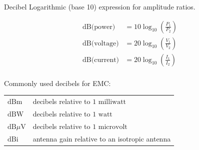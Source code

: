 \documentclass[
]{book}
\begin{document}
Decibel Logarithmic (base 10) expression for amplitude ratios.

\begin{align}
\text{dB(power)} &= 10 \log_10 \left( \frac{P_1}{P_2} \right) \\
\text{dB(voltage)} &= 20 \log_10 \left( \frac{V_1}{V_2} \right) \\
\text{dB(current)} &= 20 \log_10 \left( \frac{I_1}{I_2} \right) \\
\end{align}

Commonly used decibels for EMC:

\begin{longtable}[]{@{}ll@{}}
\toprule
\endhead
\(\text{dBm}\) & decibels relative to \(1 \text{ milliwatt}\)\tabularnewline
\(\text{dBW}\) & decibels relative to \(1 \text{ watt}\)\tabularnewline
\(\text{dB}\mu\text{V}\) & decibels relative to \(1 \text{ microvolt}\)\tabularnewline
\(\text{dBi}\) & antenna gain relative to an isotropic antenna\tabularnewline
\bottomrule
\end{longtable}
\end{document}
